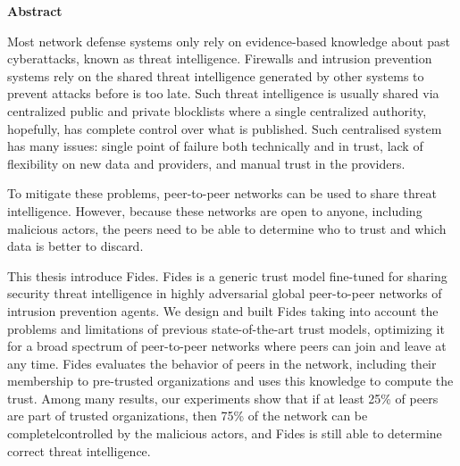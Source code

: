 \newenvironment{abstractpage}
  {\cleardoublepage\thispagestyle{empty}}
  {\vfill\cleardoublepage}
\newenvironment{abstract}[1]
  {\bigskip
   \begin{center}\bfseries#1\end{center}\small\leftskip=0.5cm\rightskip=0.5cm}
  {\par\bigskip}

\providecommand{\keywords}[2]{\footnotesize\textbf{\textit{#1:}} #2}

\begin{abstractpage}
\begin{abstract}{Abstract}

Most network defense systems only rely on evidence-based knowledge about past cyberattacks, known as threat intelligence. Firewalls and intrusion prevention systems rely on the shared threat intelligence generated by other systems to prevent attacks before is too late.
Such threat intelligence is usually shared via centralized public and private blocklists where a single centralized authority, hopefully, has complete control over what is published. Such centralised system has many issues: single point of failure both technically and in trust, lack of flexibility on new data and providers, and manual trust in the providers.

To mitigate these problems, peer-to-peer networks can be used to share threat intelligence. However, because these networks are open to anyone, including malicious actors, the peers need to be able to determine who to trust and which data is better to discard.

This thesis introduce Fides. Fides is a generic trust model fine-tuned for sharing security threat intelligence in highly adversarial global peer-to-peer networks of intrusion prevention agents.
We design and built Fides taking into account the problems and limitations of previous state-of-the-art trust models, optimizing it for a broad spectrum of peer-to-peer networks where peers can join and leave at any time.
Fides evaluates the behavior of peers in the network, including their membership to pre-trusted organizations and uses this knowledge to compute the trust.
Among many results, our experiments show that if at least 25\% of peers are part of trusted organizations, then 75\% of the network can be completelcontrolled by the malicious actors, and Fides is still able to determine correct threat intelligence.


\end{abstract}
\end{abstractpage}
